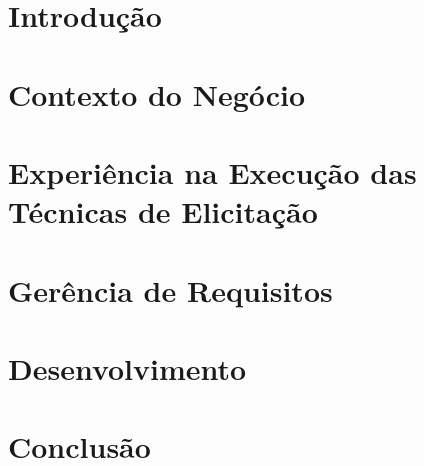 \chapter{Introdução}


\chapter{Contexto do Negócio}


\chapter{Experiência na Execução das Técnicas de  Elicitação}


\chapter{Gerência de Requisitos}


\chapter{Desenvolvimento}


\chapter{Conclusão}

